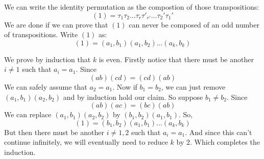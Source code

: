 \begin{prooof}
    We can write the identity permutation as the compostion of those
    transpositions:
    \[\left(1\right)= \tau_1\tau_2\dots \tau_r\tau'_{r'}\dots \tau_2'\tau_1'\] 
    We are done if we can prove that $(1)$ can never be composed of an odd
    number of transpositions. Write $(1)$ as:
    \[\left(1\right)  = \left(a_1, b_1\right) \left(a_1, b_2\right) \dots
    \left(a_k, b_k\right)\] 

    We prove by induction that $k$ is even. Firstly notice that there must be
    another $i\ne 1$ such that $a_i = a_1$. Since 
    \[\left(ab\right) \left(cd\right) = \left(cd\right) \left(ab\right)\] 
    We can safely assume that $a_2=a_1$. Now if $b_1=b_2$, we can just remove
    $(a_1, b_1)(a_2, b_2)$ and by induction hold our claim. So suppose $b_1\ne
    b_2$. Since 
    \[\left(ab\right) \left(ac\right) = \left(bc\right) \left(ab\right)\]
    We can replace $\left(a_1, b_1\right) (a_2, b_2)$ by $\left(b_1,
    b_2\right) \left(a_1, b_1\right)$. So,
    \[\left(1\right)=\left(b_1, b_2\right)\left(a_1, b_1\right)\dots
    \left(a_k, b_k\right)\]
    But then there must be another $i\ne 1, 2$ such that $a_i = a_1$. And
    since this can't continue infinitely, we will eventually need to reduce
    $k$ by $2$. Which completes the induction.
\end{prooof}



